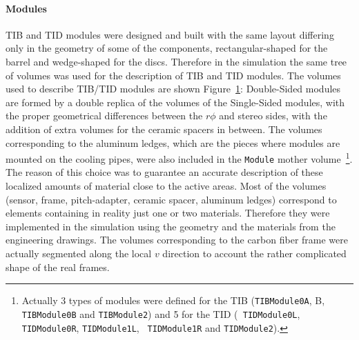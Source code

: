 \documentclass{cmspaper}
\begin{document}
\paragraph{Modules}
\begin{figure}[hbtp]
  \begin{center}
    \caption{}
    \label{fig:module}
  \end{center}
\end{figure}
TIB and TID modules were designed and built with the same layout
differing only in the geometry of some of the components, rectangular-shaped
for the barrel and wedge-shaped for the discs.
Therefore in the simulation the same tree of volumes was used for the
description of TIB and TID modules. 
The volumes used to describe TIB/TID modules are shown
Figure~\ref{fig:module}: Double-Sided modules are 
formed by a double replica of the volumes of the Single-Sided modules,
with the proper geometrical differences between the $r\phi$ and stereo sides,
with the addition of extra volumes for the ceramic spacers in between. 
The volumes corresponding to the aluminum ledges,
which are the pieces where modules are mounted on the cooling pipes, were also
included in the  {\tt Module} mother volume~\footnote{Actually 3 types
  of modules were defined for the TIB ({\tt TIBModule0A}, B, {\tt
    TIBModule0B} and {\tt TIBModule2}) and 5 for the TID ({\tt
    TIDModule0L}, {\tt TIDModule0R}, {\tt TIDModule1L}, {\tt
    TIDModule1R} and {\tt TIDModule2}).}. 
The reason of this choice was to guarantee an accurate description of
these localized amounts of material close to the active areas. 
Most of the volumes (sensor, frame, pitch-adapter, ceramic spacer,
aluminum ledges) correspond to elements containing in reality just one
or two materials. Therefore they were implemented in the simulation
using the geometry and the materials from the engineering drawings.
The volumes corresponding to the carbon fiber frame were actually
segmented along the local $v$ direction to account the rather
complicated shape of the real frames. 
\end{document}
